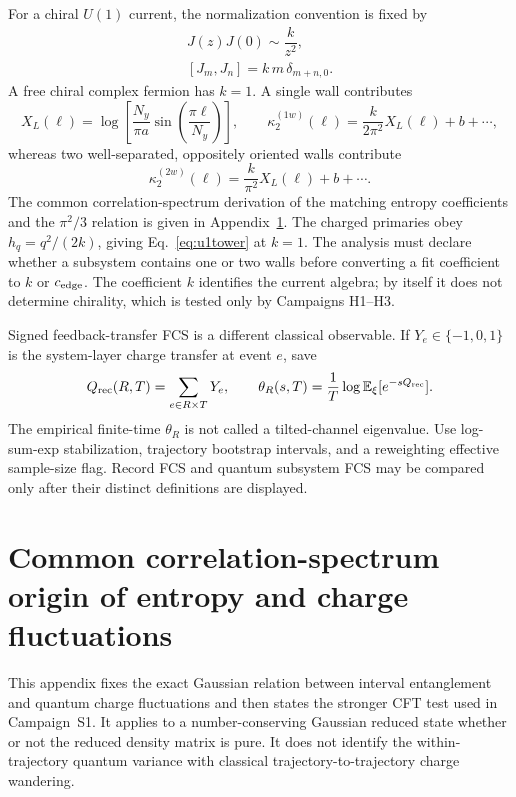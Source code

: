 \documentclass[aps,prx,onecolumn,nofootinbib,superscriptaddress,longbibliography]{revtex4-2}
\newcommand{\E}{\mathbb{E}}
\begin{document}
For a chiral $U(1)$ current, the normalization convention is fixed by
\begin{equation}
 \begin{gathered}
 J(z)J(0)\sim\dfrac{k}{z^2},\\
 [J_m,J_n]=k\,m\,\delta_{m+n,0}.
 \end{gathered}
\end{equation}
A free chiral complex fermion has $k=1$.  A single wall contributes
\begin{equation}
 X_L(\ell)=\log\!\left[\frac{N_y}{\pi a}
 \sin\!\left(\frac{\pi\ell}{N_y}\right)\right],
 \qquad
 \kappa_2^{(1w)}(\ell)=\frac{k}{2\pi^2}X_L(\ell)+b+\cdots,
\end{equation}
whereas two well-separated, oppositely oriented walls contribute
\begin{equation}
 \kappa_2^{(2w)}(\ell)=\frac{k}{\pi^2}X_L(\ell)+b+\cdots.
\end{equation}
The common correlation-spectrum derivation of the matching entropy coefficients and the
$\pi^2/3$ relation is given in Appendix~\ref{app:entropy-charge-spectrum}.
The charged primaries obey $h_q=q^2/(2k)$, giving Eq.~\eqref{eq:u1tower} at $k=1$.
The analysis must declare whether a subsystem contains one or two walls before converting a
fit coefficient to $k$ or $c_{\rm edge}$.  The coefficient $k$ identifies the current algebra;
by itself it does not determine chirality, which is tested only by Campaigns H1--H3.

Signed feedback-transfer FCS is a different classical observable.  If $Y_e\in\{-1,0,1\}$
is the system-layer charge transfer at event $e$, save
\begin{equation}
 Q_{\rm rec}(R,T)=\sum_{e\in R\times T}Y_e,
 \qquad
 \theta_R(s,T)=\frac1T\log\E_\xi[e^{-sQ_{\rm rec}}].
\end{equation}
The empirical finite-time $\theta_R$ is not called a tilted-channel eigenvalue.  Use
log-sum-exp stabilization, trajectory bootstrap intervals, and a reweighting effective
sample-size flag.  Record FCS and quantum subsystem FCS may be compared only after their
distinct definitions are displayed.

\section{Common correlation-spectrum origin of entropy and charge fluctuations}
\label{app:entropy-charge-spectrum}

This appendix fixes the exact Gaussian relation between interval entanglement and quantum
charge fluctuations and then states the stronger CFT test used in Campaign~S1.  It applies
to a number-conserving Gaussian reduced state whether or not the reduced density matrix is
pure.  It does not identify the within-trajectory quantum variance with classical
trajectory-to-trajectory charge wandering.
\end{document}
